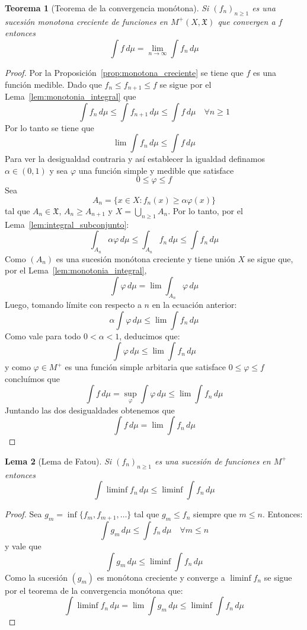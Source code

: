 \documentclass[12pt,a4paper]{article}
\theoremstyle{profesional}
\newtheorem{teorema}{Teorema}[section]
\newtheorem{lemma}[teorema]{Lema}
\theoremstyle{definicion-style}
\newcommand{\X}{\mathfrak{X}}
\begin{document}
\begin{teorema}[Teorema de la convergencia monótona]
    Si \( {(f_n)}_{n \geq 1} \) es una sucesión monotona creciente de funciones en \( M^+(X, \X) \) que convergen a \( f \) entonces \[
        \int f \, d\mu = \lim_{n \to \infty} \int f_n \, d\mu
    \]
\end{teorema}
\begin{proof}
    Por la Proposición~\ref{prop:monotona_creciente} se tiene que \( f \) es una función medible. Dado que \( f_n \leq f_{n+1} \leq f \) se sigue por el Lema~\ref{lem:monotonia_integral} que \[
        \int f_n \, d \mu \leq \int f_{n+1} \, d \mu \leq \int f \, d \mu \quad \forall n \geq 1
    \]
    Por lo tanto se tiene que \[
        \lim \int f_n \, d \mu \leq \int f \, d \mu
    \]
    Para ver la desigualdad contraria y así establecer la igualdad definamos \( \alpha \in (0, 1) \) y sea \( \varphi \) una función simple y medible que satisface \[
        0 \leq \varphi \leq f
    \]
    Sea \[
        A_n = \{ x \in X : f_n(x) \geq \alpha \varphi(x) \}
    \]
    tal que \( A_n \in \X \), \( A_n \geq A_{n+1} \) y \( X = \bigcup_{n \geq 1} A_n \). Por lo tanto, por el Lema~\ref{lem:integral_subconjunto}:\[
        \int_{A_n} \alpha \varphi \, d \mu \leq \int_{A_n} f_n \, d \mu \leq \int f_n \, d \mu
    \]
    Como \( (A_n) \) es una sucesión monótona creciente y tiene unión \( X \) se sigue que, por el Lema~\ref{lem:monotonia_integral}, \[
        \int \varphi \, d \mu = \lim \int_{A_n} \varphi \, d \mu
    \]
    Luego, tomando límite con respecto a \( n \) en la ecuación anterior:\[
        \alpha \int \varphi \, d \mu \leq \lim \int f_n \, d \mu
    \]
    Como vale para todo \( 0 < \alpha < 1 \), deducimos que:\[
        \int \varphi \, d \mu \leq \lim \int f_n \, d \mu
    \]
    y como \( \varphi \in M^+ \) es una función simple arbitaria que satisface \( 0 \leq \varphi \leq f \) concluímos que \[
        \int f \, d \mu = \sup_{\varphi} \int \varphi \, d \mu \leq \lim \int f_n \, d \mu
    \]
    Juntando las dos desigualdades obtenemos que \[
        \int f \, d \mu = \lim \int f_n \, d \mu
    \]
\end{proof}

\begin{lemma}[Lema de Fatou]
    Si \( {(f_n)}_{n \geq 1} \) es una sucesión de funciones en \( M^+ \) entonces \[
        \int \liminf f_n \, d\mu \leq \liminf \int f_n \, d\mu
    \]
\end{lemma}
\begin{proof}
    Sea \( g_m = \inf \{ f_m, f_{m+1}, \ldots \} \) tal que \( g_m \leq f_n \) siempre que \( m \leq n \). Entonces: \[
        \int g_m \, d \mu \leq \int f_n \, d \mu \quad \forall m \leq n
    \]
    y vale que \[
        \int g_m \, d \mu \leq \liminf \int f_n \, d \mu
    \]
    Como la sucesión \( (g_m) \) es monótona creciente y converge a \( \liminf f_n \) se sigue por el teorema de la convergencia monótona que: \[
        \int \liminf f_n \, d \mu = \lim \int g_m \, d \mu \leq \liminf \int f_n \, d \mu
    \]
\end{proof}
\end{document}
